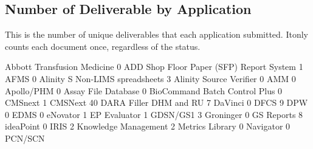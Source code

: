 \documentclass{article}
\begin{document}
\subsection{Number of Deliverable by Application}
This is the number of unique deliverables that each application submitted. Itonly counts
each document once, regardless of the status.
\begin{Schunk}
\begin{Soutput}
             Abbott Transfusion Medicine
                                       0
ADD Shop Floor Paper (SFP) Report System
                                       1
                                    AFMS
                                       0
         Alinity S Non-LIMS spreadsheets
                                       3
                 Alinity Source Verifier
                                       0
                                     AMM
                                       0
                              Apollo/PHM
                                       0
                     Assay File Database
                                       0
           BioCommand Batch Control Plus
                                       0
                                 CMSnext
                                       1
                                 CMSNext
                                      40
                  DARA Filler DHM and RU
                                       7
                                 DaVinci
                                       0
                                    DFCS
                                       9
                                     DPW
                                       0
                                    EDMS
                                       0
                                eNovator
                                       1
                            EP Evaluator
                                       1
                                GDSN/GS1
                                       3
                               Groninger
                                       0
                              GS Reports
                                       8
                               ideaPoint
                                       0
                                    IRIS
                                       2
                    Knowledge Management
                                       2
                         Metrics Library
                                       0
                               Navigator
                                       0
                                 PCN/SCN

\end{Soutput}
\end{Schunk}
\end{document}
